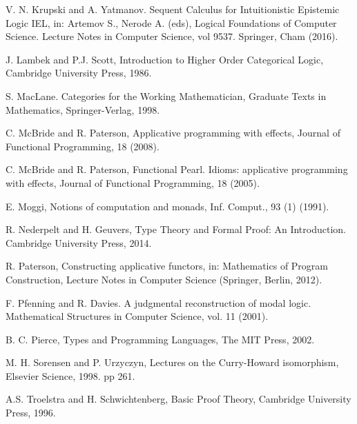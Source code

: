 \documentclass[a4paper]{article}
\begin{document}
\begin{thebibliography}{}
   V. N. Krupski and A. Yatmanov. Sequent Calculus for Intuitionistic Epistemic Logic IEL,
   in: Artemov S., Nerode A. (eds), Logical Foundations of Computer Science. Lecture Notes in Computer Science, vol 9537. Springer, Cham (2016).

   J. Lambek and P.J. Scott, Introduction to Higher Order Categorical Logic, Cambridge University Press, 1986.

   S. MacLane. Categories for the Working Mathematician, Graduate Texts in Mathematics, Springer-Verlag, 1998.

   C. McBride and R. Paterson, Applicative programming with effects, Journal of
  Functional Programming, 18 (2008).

   C. McBride and R. Paterson, Functional Pearl. Idioms: applicative programming with
  effects, Journal of Functional Programming, 18 (2005).

   E. Moggi, Notions of computation and monads, Inf. Comput., 93 (1) (1991).

   R. Nederpelt and H. Geuvers, Type Theory and Formal Proof: An Introduction.
  Cambridge University Press, 2014.

   R. Paterson, Constructing applicative functors,
  in: Mathematics of Program Construction, Lecture Notes in Computer Science (Springer, Berlin, 2012).

   F. Pfenning and R. Davies. A judgmental reconstruction of modal logic.
  Mathematical Structures in Computer Science, vol. 11 (2001).

   B. C. Pierce, Types and Programming Languages, The MIT
  Press, 2002.

   M. H. Sorensen and P. Urzyczyn, Lectures on the Curry-Howard isomorphism, Elsevier Science, 1998.
  pp 261.

   A.S. Troelstra and H. Schwichtenberg, Basic Proof Theory, Cambridge University Press, 1996.
  \end{thebibliography}
\end{document}
